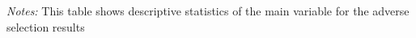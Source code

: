 \documentclass[12pt]{article}
\makeatletter
\newcommand{\red}[1]{\textcolor{red}{#1}}
\providecommand{\resultsuffix}{}
\let\SourceInput
\renewcommand{}[1]{%
  \IfFileExists{../../#1\resultsuffix.tex}{\SourceInput{../../#1\resultsuffix.tex}}{%
  \IfFileExists{../../#1}{\SourceInput{../../#1}}{%
    \IfFileExists{../../#1.tex}{\SourceInput{../../#1.tex}}{%
      \fbox{\scriptsize Missing table: \detokenize{#1}}}}}}
\let\SourceIncludeGraphics\includegraphics
\newcommand{\MissingGraphic}[2][]{%
  \adjustbox{#1}{\fbox{\parbox[c][2.2cm][c]{4cm}{\centering\scriptsize
  Missing figure: \detokenize{#2}}}}}
\renewcommand{\includegraphics}[2][]{%
  \filename@parse{#2}%
  \edef\ResultGraphic{../../\filename@area\filename@base\resultsuffix.\filename@ext}%
  \IfFileExists{\ResultGraphic}{\SourceIncludeGraphics[#1]{\ResultGraphic}}{%
  \IfFileExists{../../#2}{\SourceIncludeGraphics[#1]{../../#2}}{%
  \IfFileExists{../../#2.pdf}{\SourceIncludeGraphics[#1]{../../#2.pdf}}{%
  \IfFileExists{../../#2.png}{\SourceIncludeGraphics[#1]{../../#2.png}}{%
  \IfFileExists{../../#2.jpg}{\SourceIncludeGraphics[#1]{../../#2.jpg}}{%
  \IfFileExists{../../#2.jpeg}{\SourceIncludeGraphics[#1]{../../#2.jpeg}}{%
  \MissingGraphic[#1]{#2}}}}}}}}
\makeatother
\begin{document}
 \begin{table}[htbp!]
     \centering
     \caption{Descriptive Statistics \label{tab:_desc_adverse_main}}
     \resizebox{0.8\textwidth}{!}{
      
      }
      \begin{minipage}{\textwidth}
         {\small \textit{Notes: } This table shows descriptive statistics of the main variable for the adverse selection results }
     \end{minipage}
 \end{table}
 

%    

\FloatBarrier
\end{document}
